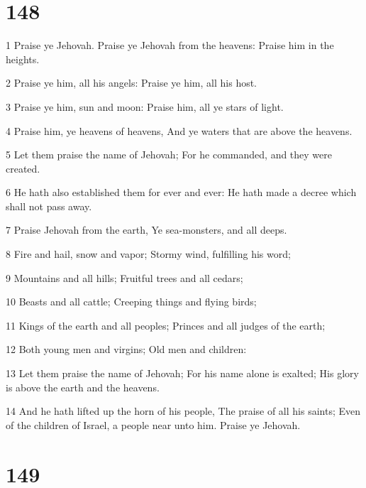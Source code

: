 \chapter{148}

\par 1 Praise ye Jehovah. Praise ye Jehovah from the heavens: Praise him in the heights.
\par 2 Praise ye him, all his angels: Praise ye him, all his host.
\par 3 Praise ye him, sun and moon: Praise him, all ye stars of light.
\par 4 Praise him, ye heavens of heavens, And ye waters that are above the heavens.
\par 5 Let them praise the name of Jehovah; For he commanded, and they were created.
\par 6 He hath also established them for ever and ever: He hath made a decree which shall not pass away.
\par 7 Praise Jehovah from the earth, Ye sea-monsters, and all deeps.
\par 8 Fire and hail, snow and vapor; Stormy wind, fulfilling his word;
\par 9 Mountains and all hills; Fruitful trees and all cedars;
\par 10 Beasts and all cattle; Creeping things and flying birds;
\par 11 Kings of the earth and all peoples; Princes and all judges of the earth;
\par 12 Both young men and virgins; Old men and children:
\par 13 Let them praise the name of Jehovah; For his name alone is exalted; His glory is above the earth and the heavens.
\par 14 And he hath lifted up the horn of his people, The praise of all his saints; Even of the children of Israel, a people near unto him. Praise ye Jehovah.

\chapter{149}

